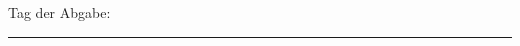 {      
       \begin{center}
         Tag der Abgabe: \thedatum 
       \end{center}
         
      
      \thebetreuerFeld
      

      \textcolor{HKS66}{\rule{\linewidth}{0.4mm}}\\[1.5ex]
       \begin{hsheadfont}
         ~\hfill~
       \end{hsheadfont}
    }
